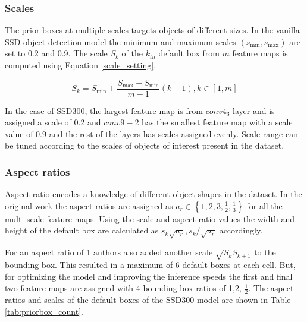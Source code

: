      \subsubsection{Scales}
     The prior boxes at multiple scales targets objects of different sizes. In the vanilla SSD object detection model the minimum and maximum scales $(s_{\min}, s_{\max})$ are set to 0.2 and 0.9. The scale $S_{k}$ of the $k_{th}$ default box from $m$ feature maps is computed using Equation \ref{scale_setting}.
     
     \begin{equation}
        \label{scale_setting}
        S_{k}=S_{\min }+\frac{S_{\max }-S_{\min }}{m-1}(k-1), k \in[1, m]
     \end{equation}
     
     In the case of SSD300, the largest feature map is from $conv{4_3}$ layer and is assigned a scale of 0.2 and $conv9-2$ has the smallest feature map with a scale value of 0.9 and the rest of the layers has scales assigned evenly. Scale range can be tuned according to the scales of objects of interest present in the dataset.
     
     \subsubsection{Aspect ratios}
     Aspect ratio encodes a knowledge of different object shapes in the dataset. In the original work the aspect ratios are assigned as $a_{r} \in\left\{1,2,3, \frac{1}{2}, \frac{1}{3}\right\}$ for all the multi-scale feature maps. Using the scale and aspect ratio values the width and height of the default box are calculated as $s_{k} \sqrt{a_{r}}, s_{k} / \sqrt{a_{r}}$ accordingly. 
     
     For an aspect ratio of 1 authors also added another scale $\sqrt{S_{k} S_{k+1}}$ to the bounding box. This resulted in a maximum of 6 default boxes at each cell. But, for optimizing the model and improving the inference speeds the first and final two feature maps are assigned with 4 bounding box ratios of 1,2, $\frac{1}{2}$. The aspect ratios and scales of the default boxes of the SSD300 model are shown in Table \ref{tab:priorbox_count}.
     
